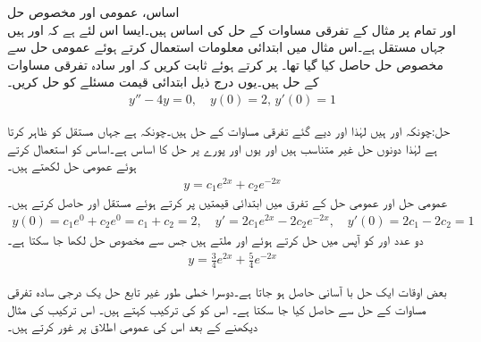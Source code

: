 \quad اساس، عمومی اور مخصوص حل\\
 اور  تمام  پر مثال  کے تفرقی مساوات  کے حل کی اساس ہیں۔ایسا اس لئے ہے کہ  اور  ہیں جہاں  مستقل ہے۔اس مثال میں ابتدائی معلومات استعمال کرتے ہوئے عمومی حل سے مخصوص حل  حاصل کیا گیا تھا۔
پر کرتے ہوئے ثابت کریں کہ  اور  سادہ تفرقی مساوات  کے حل ہیں۔یوں درج ذیل ابتدائی قیمت مسئلے کو حل کریں۔
\begin{align*}
y''-4y=0, \quad y(0)=2, \, y'(0)=1
\end{align*}

حل:چونکہ  اور   ہیں لہٰذا  اور  دیے گئے تفرقی مساوات کے حل ہیں۔چونکہ  ہے جہاں  مستقل کو ظاہر کرتا ہے  لہٰذا دونوں حل غیر متناسب ہیں اور یوں  اور  پورے  پر  حل کا  اساس ہے۔اساس کو استعمال کرتے ہوئے عمومی حل لکھتے ہیں۔
\begin{align*}
y=c_1e^{2x}+c_2e^{-2x}
\end{align*}
عمومی حل اور عمومی حل کے تفرق میں ابتدائی قیمتیں پر کرتے ہوئے مستقل  اور  حاصل کرتے ہیں۔
\begin{align*}
y(0)=c_1e^{0}+c_2e^{0}=c_1+c_2=2, \quad y'=2c_1e^{2x}-2c_2e^{-2x}, \quad y'(0)=2c_1-2c_2=1
\end{align*}
دو عدد   اور  کو آپس میں حل کرتے ہوئے  اور  ملتے ہیں جس سے مخصوص حل لکھا جا سکتا ہے۔
\begin{align*}
y=\frac{3}{4}e^{2x}+\frac{5}{4}e^{-2x}
\end{align*}

بعض اوقات ایک حل با آسانی حاصل ہو جاتا ہے۔دوسرا خطی طور غیر تابع حل یک درجی سادہ تفرقی مساوات کے حل سے حاصل کیا جا سکتا ہے۔ اس کو  کی ترکیب کہتے ہیں۔ اس ترکیب کی مثال دیکھنے کے بعد اس کی عمومی اطلاق پر غور کرتے ہیں۔

